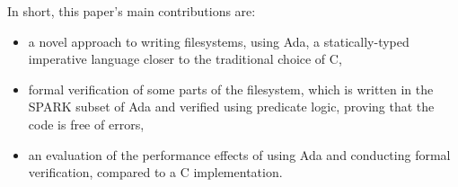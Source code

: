 In short, this paper's main contributions are:

\begin{itemize}
  \item a novel approach to writing filesystems, using Ada, a statically-typed imperative language closer to the traditional choice of C,
  \item formal verification of some parts of the filesystem, which is written in the SPARK subset of Ada and verified using predicate logic, proving that the code is free of errors,
  \item an evaluation of the performance effects of using Ada and conducting formal verification, compared to a C implementation.
\end{itemize}
